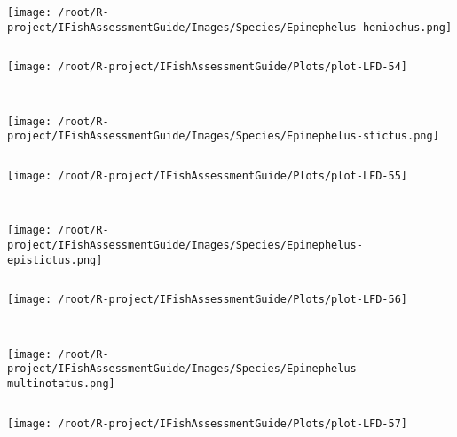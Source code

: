 \documentclass{report}\usepackage[]{graphicx}\usepackage[]{color}
\makeatletter
\def\maxwidth{ %
  \ifdim\Gin@nat@width>\linewidth
    \linewidth
  \else
    \Gin@nat@width
  \fi
}
\newenvironment{kframe}{%
 \def\at@end@of@kframe{}%
 \ifinner\ifhmode%
  \def\at@end@of@kframe{\end{minipage}}%
  \begin{minipage}{\columnwidth}%
 \fi\fi%
 \def\FrameCommand##1{\hskip\@totalleftmargin \hskip-\fboxsep
 \colorbox{shadecolor}{##1}\hskip-\fboxsep
     \hskip-\linewidth \hskip-\@totalleftmargin \hskip\columnwidth}%
 \MakeFramed {\advance\hsize-\width
   \@totalleftmargin\z@ \linewidth\hsize
   \@setminipage}}%
 {\par\unskip\endMakeFramed%
 \at@end@of@kframe}
\newenvironment{knitrout}{}{} %
\makeatother
\begin{document}
\begin{knitrout}
\begin{kframe}
\begin{verbatim}
\end{verbatim}
\end{kframe}
\texttt{[image: /root/R-project/IFishAssessmentGuide/Images/Species/Epinephelus-heniochus.png]}
\begin{kframe}\begin{verbatim}
\end{verbatim}
\end{kframe}
\texttt{[image: /root/R-project/IFishAssessmentGuide/Plots/plot-LFD-54]} 
\begin{kframe}\begin{verbatim}
 
\end{verbatim}
\end{kframe}
\texttt{[image: /root/R-project/IFishAssessmentGuide/Images/Species/Epinephelus-stictus.png]}
\begin{kframe}\begin{verbatim}
\end{verbatim}
\end{kframe}
\texttt{[image: /root/R-project/IFishAssessmentGuide/Plots/plot-LFD-55]} 
\begin{kframe}\begin{verbatim}
 
\end{verbatim}
\end{kframe}
\texttt{[image: /root/R-project/IFishAssessmentGuide/Images/Species/Epinephelus-epistictus.png]}
\begin{kframe}\begin{verbatim}
\end{verbatim}
\end{kframe}
\texttt{[image: /root/R-project/IFishAssessmentGuide/Plots/plot-LFD-56]} 
\begin{kframe}\begin{verbatim}
 
\end{verbatim}
\end{kframe}
\texttt{[image: /root/R-project/IFishAssessmentGuide/Images/Species/Epinephelus-multinotatus.png]}
\begin{kframe}\begin{verbatim}
\end{verbatim}
\end{kframe}
\texttt{[image: /root/R-project/IFishAssessmentGuide/Plots/plot-LFD-57]} 
\begin{kframe}\begin{verbatim}
 

\end{verbatim}
\end{kframe}
\end{knitrout}
\end{document}
